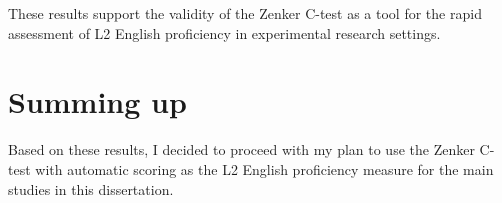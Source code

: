 These results support the validity of the Zenker C-test as a tool for the rapid assessment of L2 English proficiency in experimental research settings. 

\section{Summing up}

Based on these results, I decided to proceed with my plan to use the Zenker C-test with automatic scoring as the L2 English proficiency measure for the main studies in this dissertation.

\setlength{\parindent}{0in}
